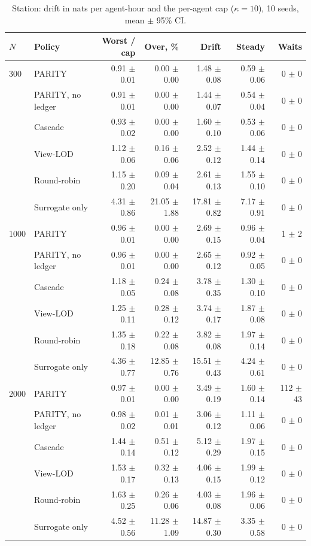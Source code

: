 \begin{table}[t]
\centering
\caption{Station: drift in nats per agent-hour and the per-agent cap ($\kappa=10$), 10 seeds, mean $\pm$ 95\% CI.}
\label{tab:station}
\begin{tabular}{llrrrrr}
\toprule
$N$ & Policy & Worst / cap & Over, \% & Drift & Steady & Waits \\
\midrule
300 & PARITY & 0.91 $\pm$ 0.01 & 0.00 $\pm$ 0.00 & 1.48 $\pm$ 0.08 & 0.59 $\pm$ 0.06 & 0 $\pm$ 0 \\
 & PARITY, no ledger & 0.91 $\pm$ 0.01 & 0.00 $\pm$ 0.00 & 1.44 $\pm$ 0.07 & 0.54 $\pm$ 0.04 & 0 $\pm$ 0 \\
 & Cascade & 0.93 $\pm$ 0.02 & 0.00 $\pm$ 0.00 & 1.60 $\pm$ 0.10 & 0.53 $\pm$ 0.06 & 0 $\pm$ 0 \\
 & View-LOD & 1.12 $\pm$ 0.06 & 0.16 $\pm$ 0.06 & 2.52 $\pm$ 0.12 & 1.44 $\pm$ 0.14 & 0 $\pm$ 0 \\
 & Round-robin & 1.15 $\pm$ 0.20 & 0.09 $\pm$ 0.04 & 2.61 $\pm$ 0.13 & 1.55 $\pm$ 0.10 & 0 $\pm$ 0 \\
 & Surrogate only & 4.31 $\pm$ 0.86 & 21.05 $\pm$ 1.88 & 17.81 $\pm$ 0.82 & 7.17 $\pm$ 0.91 & 0 $\pm$ 0 \\
\midrule
1000 & PARITY & 0.96 $\pm$ 0.01 & 0.00 $\pm$ 0.00 & 2.69 $\pm$ 0.15 & 0.96 $\pm$ 0.04 & 1 $\pm$ 2 \\
 & PARITY, no ledger & 0.96 $\pm$ 0.01 & 0.00 $\pm$ 0.00 & 2.65 $\pm$ 0.12 & 0.92 $\pm$ 0.05 & 0 $\pm$ 0 \\
 & Cascade & 1.18 $\pm$ 0.05 & 0.24 $\pm$ 0.08 & 3.78 $\pm$ 0.35 & 1.30 $\pm$ 0.10 & 0 $\pm$ 0 \\
 & View-LOD & 1.25 $\pm$ 0.11 & 0.28 $\pm$ 0.12 & 3.74 $\pm$ 0.17 & 1.87 $\pm$ 0.08 & 0 $\pm$ 0 \\
 & Round-robin & 1.35 $\pm$ 0.18 & 0.22 $\pm$ 0.08 & 3.82 $\pm$ 0.08 & 1.97 $\pm$ 0.14 & 0 $\pm$ 0 \\
 & Surrogate only & 4.36 $\pm$ 0.77 & 12.85 $\pm$ 0.76 & 15.51 $\pm$ 0.43 & 4.24 $\pm$ 0.61 & 0 $\pm$ 0 \\
\midrule
2000 & PARITY & 0.97 $\pm$ 0.01 & 0.00 $\pm$ 0.00 & 3.49 $\pm$ 0.19 & 1.60 $\pm$ 0.14 & 112 $\pm$ 43 \\
 & PARITY, no ledger & 0.98 $\pm$ 0.02 & 0.01 $\pm$ 0.01 & 3.06 $\pm$ 0.12 & 1.11 $\pm$ 0.06 & 0 $\pm$ 0 \\
 & Cascade & 1.44 $\pm$ 0.14 & 0.51 $\pm$ 0.12 & 5.12 $\pm$ 0.29 & 1.97 $\pm$ 0.15 & 0 $\pm$ 0 \\
 & View-LOD & 1.53 $\pm$ 0.17 & 0.32 $\pm$ 0.13 & 4.06 $\pm$ 0.15 & 1.99 $\pm$ 0.12 & 0 $\pm$ 0 \\
 & Round-robin & 1.63 $\pm$ 0.25 & 0.26 $\pm$ 0.06 & 4.03 $\pm$ 0.08 & 1.96 $\pm$ 0.06 & 0 $\pm$ 0 \\
 & Surrogate only & 4.52 $\pm$ 0.56 & 11.28 $\pm$ 1.09 & 14.87 $\pm$ 0.30 & 3.35 $\pm$ 0.58 & 0 $\pm$ 0 \\
\bottomrule
\end{tabular}
\end{table}
